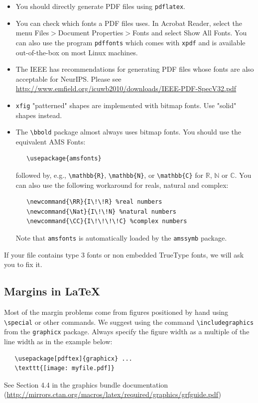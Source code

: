 \documentclass{article}
\begin{document}
\begin{itemize}

    \item You should directly generate PDF files using \verb+pdflatex+.

    \item You can check which fonts a PDF files uses.  In Acrobat Reader, select the
          menu Files$>$Document Properties$>$Fonts and select Show All Fonts. You can
          also use the program \verb+pdffonts+ which comes with \verb+xpdf+ and is
          available out-of-the-box on most Linux machines.

    \item The IEEE has recommendations for generating PDF files whose fonts are also
          acceptable for NeurIPS. Please see
          \url{http://www.emfield.org/icuwb2010/downloads/IEEE-PDF-SpecV32.pdf}

    \item \verb+xfig+ "patterned" shapes are implemented with bitmap fonts.  Use
          "solid" shapes instead.

    \item The \verb+\bbold+ package almost always uses bitmap fonts.  You should use
          the equivalent AMS Fonts:
          \begin{verbatim}
   \usepackage{amsfonts}
\end{verbatim}
          followed by, e.g., \verb+\mathbb{R}+, \verb+\mathbb{N}+, or \verb+\mathbb{C}+
          for $\mathbb{R}$, $\mathbb{N}$ or $\mathbb{C}$.  You can also use the following
          workaround for reals, natural and complex:
          \begin{verbatim}
   \newcommand{\RR}{I\!\!R} %real numbers
   \newcommand{\Nat}{I\!\!N} %natural numbers
   \newcommand{\CC}{I\!\!\!\!C} %complex numbers
\end{verbatim}
          Note that \verb+amsfonts+ is automatically loaded by the \verb+amssymb+ package.

\end{itemize}

If your file contains type 3 fonts or non embedded TrueType fonts, we will ask
you to fix it.

\subsection{Margins in \LaTeX{}}

Most of the margin problems come from figures positioned by hand using
\verb+\special+ or other commands. We suggest using the command
\verb+\includegraphics+ from the \verb+graphicx+ package. Always specify the
figure width as a multiple of the line width as in the example below:
\begin{verbatim}
   \usepackage[pdftex]{graphicx} ...
   \texttt{[image: myfile.pdf]}
\end{verbatim}
See Section 4.4 in the graphics bundle documentation
(\url{http://mirrors.ctan.org/macros/latex/required/graphics/grfguide.pdf})
\end{document}
